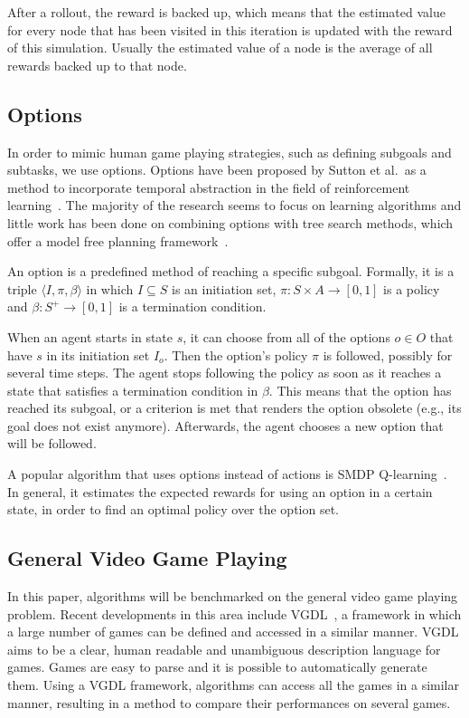 After a rollout, the reward is backed up, which means that the estimated value
for every node that has been visited in this iteration is updated with the
reward of this simulation. Usually the estimated value of a node is the average
of all rewards backed up to that node.

\subsection{Options}
\label{subsec:options}

In order to mimic human game playing strategies, such as defining subgoals and
subtasks, we use options. Options have been proposed by Sutton et al.\ as a
method to incorporate temporal abstraction in the field of reinforcement
learning~\cite{sutton1999between}. The majority of the research seems to focus
on learning algorithms and little work has been done on combining options with
tree search methods, which offer a model free planning
framework~\cite{barto2003recent}.

An option is a predefined method of reaching a specific
subgoal. Formally, it is a triple $\langle I, \pi, \beta\rangle$ in which $I
\subseteq S$ is an initiation set, $\pi: S \times A \rightarrow [0, 1]$ is a
policy and $\beta: S^+ \rightarrow[0,1]$ is a termination condition.

When an agent starts in state $s$, it can choose from all of the options $o \in
O$ that have $s$ in its initiation set $I_o$. Then the option's policy $\pi$ is
followed, possibly for several time steps. The agent stops following the policy
as soon as it reaches a state that satisfies a termination condition in $\beta$.
This means that the option has reached its subgoal, or a criterion is met that
renders the option obsolete (e.g., its goal does not exist anymore).
Afterwards, the agent chooses a new option that will be followed.

A popular algorithm that uses options instead of actions is SMDP
Q-learning~\cite{sutton1999between}. In general, it estimates the expected
rewards for using an option in a certain state, in order to find an optimal
policy over the option set.

\subsection{General Video Game Playing}
\label{subsec:vgdl}
In this paper, algorithms will be benchmarked on the general video game playing
problem. Recent developments in this area include VGDL~\cite{schaul2013video}, a
framework in which a large number of games can be defined and accessed in a
similar manner.  VGDL aims to be a clear, human readable and unambiguous
description language for games. Games are easy to parse and it is possible to
automatically generate them. Using a VGDL framework, algorithms can access all
the games in a similar manner, resulting in a method to compare their
performances on several games.

